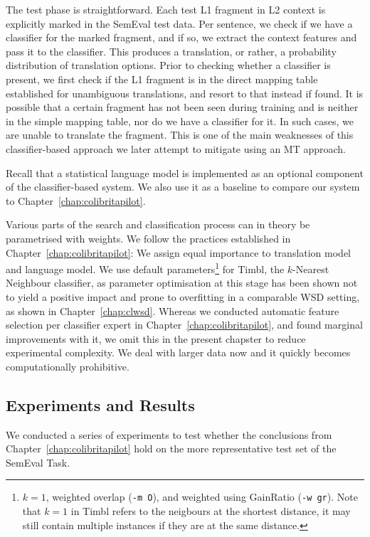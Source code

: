 The test phase is straightforward. Each test L1 fragment in L2 context
is explicitly marked in the SemEval test data. Per sentence, we check
if we have a classifier for the marked fragment, and if so, we extract
the context features and pass it to the classifier. This produces a
translation, or rather, a probability distribution of translation
options. Prior to checking whether a classifier is present, we first
check if the L1 fragment is in the direct mapping table established
for unambiguous translations, and resort to that instead if found. It
is possible that a certain fragment has not been seen during training
and is neither in the simple mapping table, nor do we have a
classifier for it. In such cases, we are unable to translate the
fragment. This is one of the main weaknesses of this classifier-based
approach we later attempt to mitigate using an MT approach.

Recall that a statistical language model is implemented as an optional component
of the classifier-based system. We also use it as a baseline to compare our
system to Chapter~\ref{chap:colibritapilot}.

Various parts of the search and classification process can in theory be
parametrised with weights. We follow the practices established in
Chapter~\ref{chap:colibritapilot}: We assign equal importance to translation
model and language model. We use default parameters\footnote{$k=1$, weighted
    overlap (\texttt{-m O}), and weighted using GainRatio (\texttt{-w gr}).
Note that $k=1$ in Timbl refers to the neigbours at the shortest distance, it
may still contain multiple instances if they are at the same distance.} for
Timbl, the $k$-Nearest Neighbour classifier, as parameter optimisation at this
stage has been shown not to yield a positive impact and prone to overfitting in
a comparable WSD setting, as shown in Chapter~\ref{chap:clwsd}. Whereas we
conducted automatic feature selection per classifier expert in
Chapter~\ref{chap:colibritapilot}, and found marginal
improvements with it, we omit this in the present chapster to reduce
experimental complexity. We deal with larger data now and it quickly becomes
computationally prohibitive.

\subsection{Experiments and Results}

We conducted a series of experiments to test whether the conclusions from
Chapter~\ref{chap:colibritapilot} hold on the more representative test set of
the SemEval Task.

